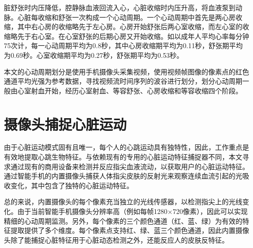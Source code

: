 {脏舒张时内压降低，腔静脉血液回流入心，心脏收缩时内压升高，将血液泵到动脉。心脏每收缩和舒张一次构成一个心动周期。一个心动周期中首先是两心房收缩，其中右心房的收缩略先于左心房。心房开始舒张后两心室收缩，而左心室的收缩略先于右心室。在心室舒张的后期心房又开始收缩。如以成年人平均心率每分钟75次计，每一心动周期平均为0.8秒，其中心房收缩期平均为0.11秒，舒张期平均为0.69秒。心室收缩期平均为0.27秒，舒张期平均为0.53秒\cite{2006The}。}
\par
{本文的心动周期划分是使用手机摄像头采集视频，使用视频帧图像的像素点的红色通道平均光强为参考数据，寻找视频流时间序列的波谷进行划分，划分心动周期一般由心室射血开始，经历心室射血、等容舒张、心房收缩和等容收缩四个阶段。}


\section{摄像头捕捉心脏运动}
{
由于心脏运动模式固有且唯一，每个人的心跳运动具有独特性，因此，工作重点是有效地提取心跳生物特征。与依赖现有的专用的心脏运动特征捕捉器不同，本文寻求通过现有的商用设备来检测并反应指尖血液流动，以获取用户的心脏运动特征。通过智能手机的内置摄像头捕获人体指尖皮肤的反射光来观察连续血流引起的光吸收变化，其中包含了独特的心脏运动特征\cite{2007Photoplethysmography}。
}
\par
{
总的来说，内置摄像头的每个像素充当独立的光线传感器，以检测指尖上的光线变化。由于当前智能手机摄像头分辨率高（例如每帧1280×720像素），因此可以实现精细的心动周期监测。另外，每个像素的三个颜色通道（红、蓝、绿）为有效的特征提取提供了多个维度。每个像素点支持红、绿、蓝三个颜色通道，因此内置摄像头除了能捕捉心脏特征用于心脏动态检测之外\cite{2007Photoplethysmography}，还能反应人的皮肤反特征。
}
